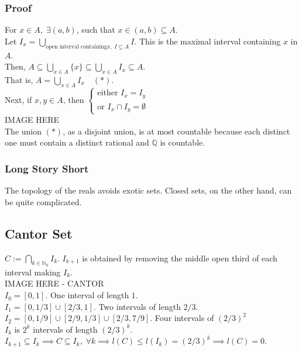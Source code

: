 \documentclass[11pt]{article}
\newcommand{\0}{\emptyset}
\newcommand{\N}{\mathbb{N}}
\newcommand{\Q}{\mathbb{Q}}
\begin{document}
\subsubsection*{Proof}
\label{sec:orga89766d}
For \(x\in A,\;\exists(a,b)\), such that \(x\in(a,b)\subseteq A\).\\[0pt]
Let \(I_{x}=\bigcup_{\text{open interval containing} x,\;I\subseteq A}I\). This is the maximal interval containing \(x\) in \(A\).\\[0pt]
Then, \(A\subseteq\bigcup_{x\in A}\{x\}\subseteq\bigcup_{x\in A}I_{x}\subseteq A\).\\[0pt]
That is, \(A=\bigcup_{x\in A}I_{x}\quad(*)\).\\[0pt]
Next, if \(x,y\in A\), then \(\begin{cases}\text{either }I_{x}=I_{y}\\ \text{or }I_{x}\cap I_{y}=\0\end{cases}\)\\[0pt]
IMAGE HERE\\[0pt]
The union \((*)\), as a disjoint union, is at most countable because each distinct one must contain a distinct rational and \(\Q\) is countable.\\[0pt]
\subsubsection*{Long Story Short}
\label{sec:org58226c9}
The topology of the reals avoids exotic sets. Closed sets, on the other hand, can be quite complicated.\\[0pt]
\subsection*{Cantor Set}
\label{sec:org3fc0bda}
\(C:=\bigcap_{k\in\N_{0}}I_{k}\). \(I_{k+1}\) is obtained by removing the middle open third of each interval making \(I_{k}\).\\[0pt]
IMAGE HERE - CANTOR\\[0pt]
\(I_{0}=[0,1]\). One interval of length \(1\).\\[0pt]
\(I_{1}=[0,1/3]\cup[2/3,1]\). Two intervals of length \(2/3\).\\[0pt]
\(I_{2}=[0,1/9]\cup[2/9,1/3]\cup[2/3,7/9]\). Four intervals of \((2/3)^{2}\)\\[0pt]
\(I_{k}\) is \(2^{k}\) intervals of length \((2/3)^{k}\).\\[0pt]
\(I_{k+1}\subseteq I_{k}\implies C\subseteq I_{k},\;\forall k \implies l(C)\leq l(I_{k})=(2/3)^{k}\implies l(C)=0\).\\[0pt]
\end{document}
